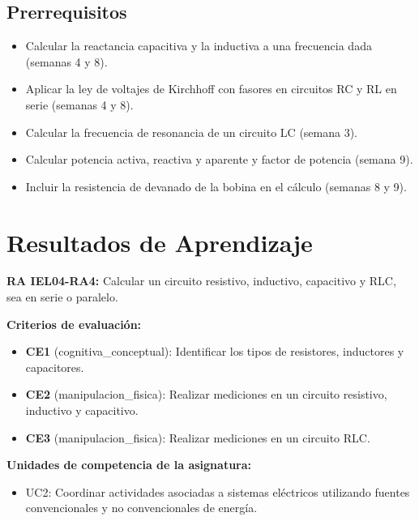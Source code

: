 \documentclass[11pt,letterpaper]{article}
\begin{document}
\subsection{Prerrequisitos}

\begin{itemize}
  \item Calcular la reactancia capacitiva y la inductiva a una frecuencia dada (semanas 4 y 8).
  \item Aplicar la ley de voltajes de Kirchhoff con fasores en circuitos RC y RL en serie (semanas 4 y 8).
  \item Calcular la frecuencia de resonancia de un circuito LC (semana 3).
  \item Calcular potencia activa, reactiva y aparente y factor de potencia (semana 9).
  \item Incluir la resistencia de devanado de la bobina en el cálculo (semanas 8 y 9).
\end{itemize}

\section{Resultados de Aprendizaje}

\begin{alineacion}
\textbf{RA IEL04-RA4:} Calcular un circuito resistivo, inductivo, capacitivo y RLC, sea en serie o paralelo.

\textbf{Criterios de evaluación:}

\begin{itemize}
  \item \textbf{CE1} (cognitiva\_conceptual): Identificar los tipos de resistores, inductores y capacitores.
  \item \textbf{CE2} (manipulacion\_fisica): Realizar mediciones en un circuito resistivo, inductivo y capacitivo.
  \item \textbf{CE3} (manipulacion\_fisica): Realizar mediciones en un circuito RLC.
\end{itemize}

\textbf{Unidades de competencia de la asignatura:}

\begin{itemize}
  \item UC2: Coordinar actividades asociadas a sistemas eléctricos utilizando fuentes convencionales y no convencionales de energía.
\end{itemize}
\end{alineacion}
\end{document}
